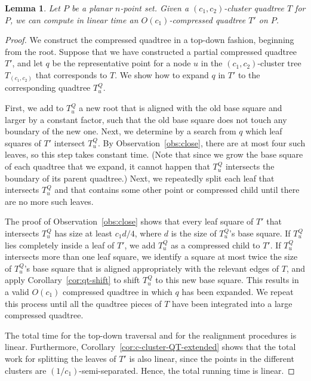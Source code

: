 \documentclass[11pt]{paper}
\newtheorem {lem}[theorem] {Lemma}
\begin{document}
    \begin{lem} \label{lem:c-cluster->compressed}
    Let $P$ be a planar $n$-point set. Given a
    $(c_1, c_2)$-cluster quadtree $T$ for $P$, we can compute in linear time an
    $O(c_1)$-compressed quadtree $T'$ on $P$.
    \end{lem}

    \begin{proof} 
      We construct the compressed quadtree in a top-down fashion, 
      beginning from the root. Suppose that we have constructed a
      partial compressed quadtree $T'$, and let $q$ be the representative
      point for a node $u$ in the $(c_1,c_2)$-cluster tree 
      $T_{(c_1,c_2)}$ that corresponds
      to $T$. We show how to expand $q$ in $T'$ to the corresponding
      quadtree $T_u^Q$. 

      First, we add to $T_u^Q$ a new root that is aligned with the
      old base square and larger by a constant factor, such that
      the old base square does not touch any boundary of the
      new one. Next, we determine by a search from $q$
      which leaf squares of $T'$ intersect
      $T_u^Q$. By Observation~\ref{obs:close}, there are at most
      four such leaves, so this step takes constant time.
      (Note that since we grow the base square of each quadtree that we
      expand, it cannot happen that $T_u^Q$ intersects the boundary of
      its parent quadtree.) Next, we repeatedly split
      each leaf that intersects $T_u^Q$ and that contains some other point
      or compressed child until there are no more such leaves.

      The proof of Observation~\ref{obs:close} shows that
      every leaf square of $T'$ that intersects
      $T_u^Q$ has size at least $c_1d/4$, where $d$
      is the size of $T_u^Q$'s base square.
      If $T_u^Q$ lies completely inside a
      leaf of $T'$, we add $T_u^Q$ as a compressed child to $T'$. 
      If $T_u^Q$ intersects more than one leaf square,  we
      identify a square at most twice the size of $T_u^Q$'s base square that is
      aligned appropriately with the relevant edges of $T$, 
       and apply Corollary~\ref{cor:qt-shift} to shift $T_u^{Q}$ 
       to this new base square.  
      This results in a valid $O(c_1)$ compressed quadtree in which
      $q$ has been expanded. We repeat this process until all the quadtree
      pieces of $T$ have been integrated into a large compressed quadtree.

      The total time for the top-down traversal and for the realignment
      procedures is linear. Furthermore, 
      Corollary~\ref{cor:c-cluster-QT-extended} shows that the 
      total work for splitting
      the leaves of $T'$ is also linear, since the points in the different
      clusters are $(1/c_1)$-semi-separated. Hence, the total running time
      is linear.
    \end{proof}
\end{document}

